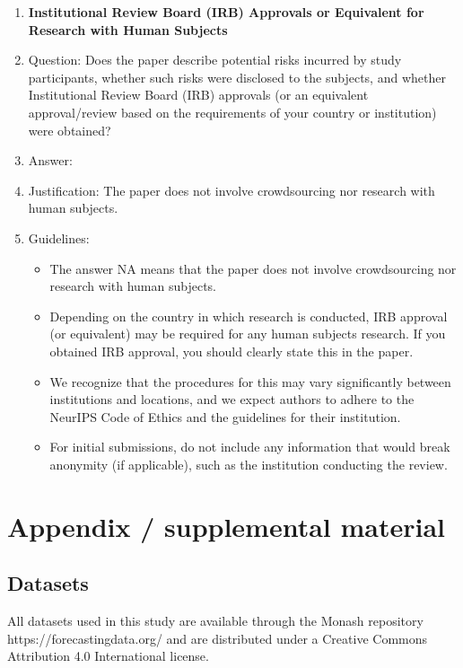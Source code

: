 \documentclass[letterpaper]{article}
\begin{document}
\begin{enumerate}
\item {\bf Institutional Review Board (IRB) Approvals or Equivalent for Research with Human Subjects}
    \item[] Question: Does the paper describe potential risks incurred by study participants, whether such risks were disclosed to the subjects, and whether Institutional Review Board (IRB) approvals (or an equivalent approval/review based on the requirements of your country or institution) were obtained?
    \item[] Answer: \answerNA{} %
    \item[] Justification: The paper does not involve crowdsourcing nor research with human subjects.
    \item[] Guidelines: 
    \begin{itemize}
        \item The answer NA means that the paper does not involve crowdsourcing nor research with human subjects.
        \item Depending on the country in which research is conducted, IRB approval (or equivalent) may be required for any human subjects research. If you obtained IRB approval, you should clearly state this in the paper. 
        \item We recognize that the procedures for this may vary significantly between institutions and locations, and we expect authors to adhere to the NeurIPS Code of Ethics and the guidelines for their institution. 
        \item For initial submissions, do not include any information that would break anonymity (if applicable), such as the institution conducting the review.
    \end{itemize}

\end{enumerate}


\FloatBarrier
\newpage
\appendix
\section{Appendix / supplemental material}
\subsection{Datasets}
All datasets used in this study are available through the Monash repository https://forecastingdata.org/ 
and are distributed under a Creative Commons Attribution 4.0 International license.
\end{document}
